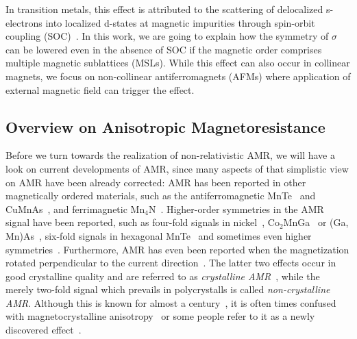 \documentclass[prb,showpacs,amsmath,amssymb,superscriptaddress,twocolumn,floatfix]{revtex4-1}
\begin{document}
In transition metals, this
effect is attributed to the scattering of delocalized s-electrons into
localized d-states at magnetic impurities through spin-orbit coupling
(SOC)~\cite{McGuire:1975}. In this work, we are going to explain how the
symmetry of $\sigma$ can be lowered even in the absence of SOC if the
magnetic order comprises multiple magnetic sublattices (MSLs). While this
effect can also occur in collinear magnets, we focus on non-collinear
antiferromagnets (AFMs) where application of external magnetic field
can trigger the effect.




\subsection{Overview on Anisotropic Magnetoresistance}

Before we turn towards the realization of non-relativistic AMR, we will have a look on current developments of AMR, since many aspects of that simplistic view on AMR have been already corrected: AMR has been reported in other magnetically ordered materials, such as the antiferromagnetic MnTe~\cite{Gonzalez-Betancourt:2024, Kriegner:2017} and CuMnAs~\cite{Volny:2020, Zubac:2021, Wadley:2016}, and ferrimagnetic Mn$_4$N~\cite{Kabara:2017}. Higher-order symmetries in the AMR signal have been reported, such as four-fold signals in nickel~\cite{Doring:1938}, Co$_2$MnGa~\cite{Ritzinger:2021, Sato:2019} or (Ga, Mn)As~\cite{Limmer:2008, DeRanieri:2008}, six-fold signals in hexagonal MnTe~\cite{Gonzalez-Betancourt:2024, Kriegner:2017} and sometimes even higher symmetries~\cite{Gonzalez-Betancourt:2024, NamHai:2012}. Furthermore, AMR has even been reported when the magnetization rotated perpendicular to the current direction~\cite{Ritzinger:2021, Limmer:2008, Limmer:2006}. The latter two effects occur in good crystalline quality and are referred to as \textit{crystalline AMR}~\cite{Ritzinger:2021, DeRanieri:2008}, while the merely two-fold signal which prevails in polycrystalls is called \textit{non-crystalline AMR}. Although this is known for almost a century~\cite{Doring:1938}, it is often times confused with magnetocrystalline anisotropy~\cite{Ritzinger:2023} or some people refer to it as a newly discovered effect~\cite{Dong:2023}.
\end{document}
